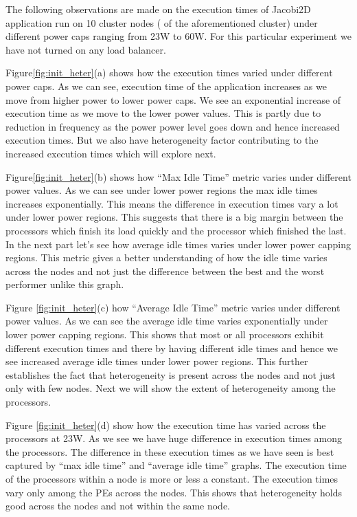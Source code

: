 The following observations are made on the execution times of Jacobi2D application
run on 10 cluster nodes ( of the aforementioned cluster) under different power caps ranging from 
23W to 60W. For this particular experiment we have not turned on any load balancer.

Figure\ref{fig:init_heter}(a) shows how the execution times varied under
different power caps.  As we can see, execution time of the application
increases as we move from higher power to lower power caps. We see an
exponential increase of execution time as we move to the lower power values.
This is partly due to reduction in frequency as the power power level goes down
and hence increased execution times. But we also have heterogeneity factor
contributing to the increased execution times which will explore next. 

Figure\ref{fig:init_heter}(b) shows how “Max Idle Time” metric varies under
 different power values.  As we can see under lower power regions the max idle
 times increases exponentially. This means the difference in execution times
 vary a lot under lower power regions. This suggests that there is a big margin
 between the processors which finish its load quickly and the processor which
 finished the last. In the next part let’s see how average idle times varies
 under lower power capping regions. This metric gives a better understanding of
 how the idle time varies across the nodes and not just the difference between
 the best and the worst performer unlike this graph.


Figure \ref{fig:init_heter}(c) how “Average Idle Time” metric varies under
different power values. As we can see the average idle time varies exponentially
under lower power capping regions. This shows that most or all processors
exhibit different execution times and there by having different idle times and
hence we see increased average idle times under lower power regions. This
further establishes the fact that heterogeneity is present across the nodes and
not just only with few nodes. Next we will show the extent of
heterogeneity among the processors. 


Figure \ref{fig:init_heter}(d) show how the execution time has varied
across the processors at 23W. As we see we have huge difference in
execution times among the processors. The difference in these execution times
as we have seen is best captured by “max idle time” and “average idle time”
graphs. The execution time of the processors within a node is more or less a
constant. The execution times vary only among the PEs across the nodes. This
shows that heterogeneity holds good across the nodes and not within the same
node.
